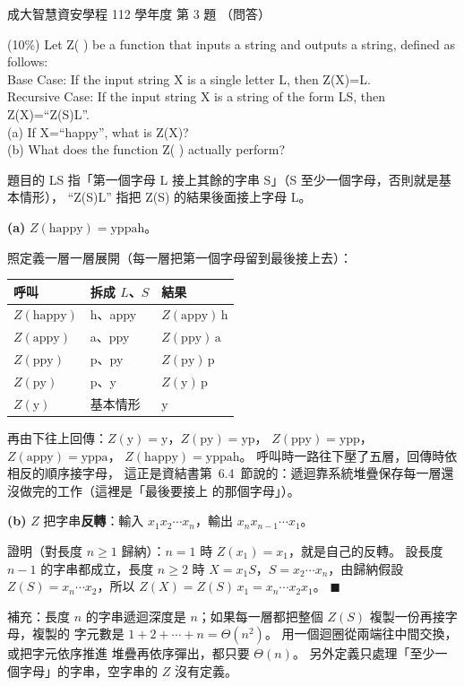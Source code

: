 \begin{pastexam}[label={px:ncku-112-isec-ds-03}]{成大智慧資安學程 112 學年度 第 3 題}
（問答）

(10\%) Let Z( ) be a function that inputs a string and outputs a string, defined as follows:\\
\hspace*{2em}Base Case: If the input string X is a single letter L, then Z(X)=L.\\
\hspace*{2em}Recursive Case: If the input string X is a string of the form LS, then Z(X)=``Z(S)L''.\\
\hspace*{2em}(a) If X=``happy'', what is Z(X)?\\
\hspace*{2em}(b) What does the function Z( ) actually perform?
\end{pastexam}

\begin{pastsoln}
題目的 LS 指「第一個字母 L 接上其餘的字串 S」（S 至少一個字母，否則就是基本情形），
``Z(S)L'' 指把 Z(S) 的結果後面接上字母 L。

\textbf{(a)} $Z(\text{happy}) = \text{yppah}$。

照定義一層一層展開（每一層把第一個字母留到最後接上去）：
\begin{center}
\begin{tabular}{lll}
\toprule
呼叫 & 拆成 $L$、$S$ & 結果 \\
\midrule
$Z(\text{happy})$ & h、appy & $Z(\text{appy})\,\text{h}$ \\
$Z(\text{appy})$ & a、ppy & $Z(\text{ppy})\,\text{a}$ \\
$Z(\text{ppy})$ & p、py & $Z(\text{py})\,\text{p}$ \\
$Z(\text{py})$ & p、y & $Z(\text{y})\,\text{p}$ \\
$Z(\text{y})$ & 基本情形 & y \\
\bottomrule
\end{tabular}
\end{center}
再由下往上回傳：$Z(\text{y}) = \text{y}$，$Z(\text{py}) = \text{yp}$，
$Z(\text{ppy}) = \text{ypp}$，$Z(\text{appy}) = \text{yppa}$，
$Z(\text{happy}) = \text{yppah}$。 呼叫時一路往下壓了五層，回傳時依相反的順序接字母，
這正是資結書第~6.4~節說的：遞迴靠系統堆疊保存每一層還沒做完的工作（這裡是「最後要接上
的那個字母」）。

\textbf{(b)} $Z$ 把字串\textbf{反轉}：輸入 $x_1x_2\cdots x_n$，輸出 $x_nx_{n-1}\cdots x_1$。

證明（對長度 $n \ge 1$ 歸納）：$n = 1$ 時 $Z(x_1) = x_1$，就是自己的反轉。 設長度 $n - 1$
的字串都成立，長度 $n \ge 2$ 時 $X = x_1 S$，$S = x_2 \cdots x_n$，由歸納假設
$Z(S) = x_n \cdots x_2$，所以 $Z(X) = Z(S)\,x_1 = x_n \cdots x_2 x_1$。 \hfill$\blacksquare$

補充：長度 $n$ 的字串遞迴深度是 $n$；如果每一層都把整個 $Z(S)$ 複製一份再接字母，複製的
字元數是 $1 + 2 + \cdots + n = \Theta(n^2)$。 用一個迴圈從兩端往中間交換，或把字元依序推進
堆疊再依序彈出，都只要 $\Theta(n)$。 另外定義只處理「至少一個字母」的字串，空字串的
$Z$ 沒有定義。
\end{pastsoln}
